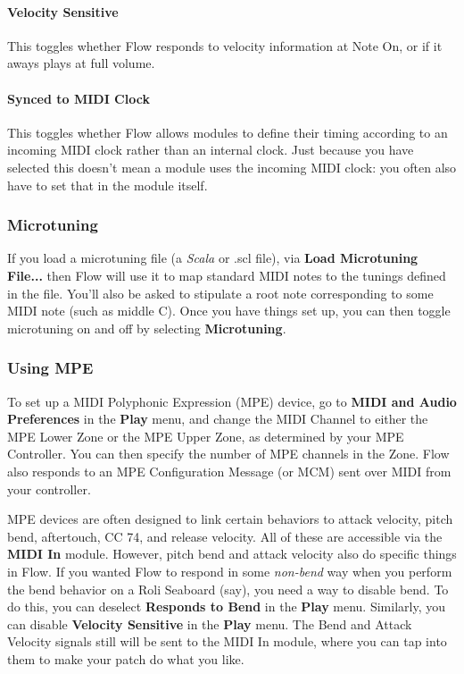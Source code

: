 \documentclass{article}
\newcommand\name{Flow}
\begin{document}
\paragraph{Velocity Sensitive}  This toggles whether Flow responds to velocity information at Note On, or if it aways plays at full volume.

\paragraph{Synced to MIDI Clock}  This toggles whether Flow allows modules to define their timing according to an incoming MIDI clock rather than an internal clock.  Just because you have selected this doesn't mean a module uses the incoming MIDI clock: you often also have to set that in the module itself.


\subsubsection{Microtuning}  If you load a microtuning file (a {\it Scala} or \textsf{.scl} file), via {\bf Load Microtuning File...} then Flow will use it to map standard MIDI notes to the tunings defined in the file.  You'll also be asked to stipulate a root note corresponding to some MIDI note (such as middle C).  Once you have things set up, you can then toggle microtuning on and off by selecting {\bf Microtuning}.  

\subsubsection{Using MPE}

To set up a MIDI Polyphonic Expression (MPE) device, go to {\bf MIDI and Audio Preferences} in the {\bf Play} menu, and change the MIDI Channel to either the MPE Lower Zone or the MPE Upper Zone, as determined by your MPE Controller.  You can then specify the number of MPE channels in the Zone.  {\name} also responds to an MPE Configuration Message (or MCM) sent over MIDI from your controller.

MPE devices are often designed to link certain behaviors to attack velocity, pitch bend, aftertouch, CC 74, and release velocity.  All of these are accessible via the {\bf MIDI In} module.  However, pitch bend and attack velocity also do specific things in Flow.  If you wanted Flow to respond in some {\it non-bend} way when you perform the bend behavior on a Roli Seaboard (say), you need a way to disable bend.  To do this, you can deselect {\bf Responds to Bend} in the {\bf Play} menu.  Similarly, you can disable {\bf Velocity Sensitive} in the {\bf Play} menu.  The Bend and Attack Velocity signals still will be sent to the MIDI In module, where you can tap into them to make your patch do what you like.
\end{document}
